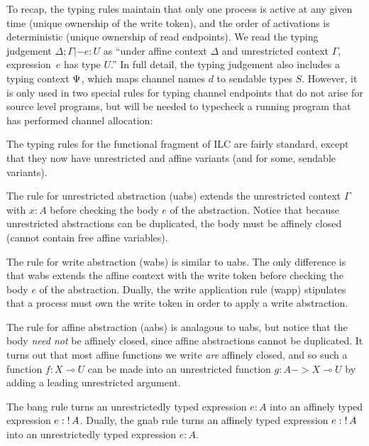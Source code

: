 To recap, the typing rules maintain that only one process is active at any given
time (unique ownership of the write token), and the order of activations is
deterministic (unique ownership of read endpoints). We read the typing judgement
$\Delta; \Gamma |- e : U$ as ``under affine context $\Delta$ and unrestricted
context $\Gamma$, expression~$e$ has type $U$.'' In full detail, the typing
judgement also includes a typing context $\Psi$, which maps channel names $d$
to sendable types $S$. However, it is only used in two special rules for typing
channel endpoints that do not arise for source level programs, but will be
needed to typecheck a running program that has performed channel allocation:
The typing rules for the functional fragment of ILC are fairly standard, except
that they now have unrestricted and affine variants (and for some, sendable
variants).

The rule for unrestricted abstraction (uabs) extends the unrestricted
context $\Gamma$ with $x : A$ before checking the body $e$ of the abstraction. Notice
that because unrestricted abstractions can be duplicated, the body must be
affinely closed (cannot contain free affine variables).

The rule for write abstraction (wabs) is similar to uabs. The only difference is
that wabs extends the affine context with the write token before checking the
body $e$ of the abstraction. Dually, the write application rule (wapp)
stipulates that a process must own the write token in order to apply a write
abstraction.

The rule for affine abstraction (aabs) is analagous to uabs, but notice that the
body \emph{need not} be affinely closed, since affine abstractions cannot be
duplicated. It turns out that most affine functions we write \emph{are} affinely
closed, and so such a function $f : X \multimap U$ can be made into an unrestricted
function $g : A -> X \multimap U$ by adding a leading unrestricted argument.

The bang rule turns an unrestrictedly typed expression $e:A$ into an affinely
typed expression $e:{!}\,{A}$. Dually, the gnab rule turns an affinely typed
expression $e:{!}\,{A}$ into an unrestrictedly typed expression $e:A$.

